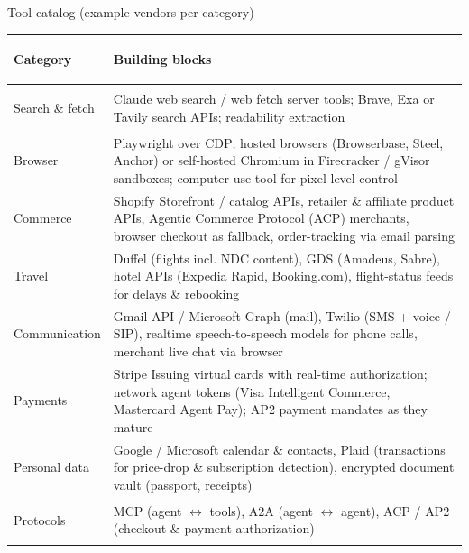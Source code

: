 \documentclass[aspectratio=169,10pt]{beamer}
\begin{document}
\begin{frame}{Tool catalog (example vendors per category)}
\scriptsize
\renewcommand{\arraystretch}{1.3}
\begin{tabularx}{\linewidth}{>{\bfseries\raggedright\arraybackslash}p{2.4cm} X}
\toprule
Category & Building blocks\\
\midrule
Search \& fetch & Claude web search / web fetch server tools; Brave, Exa or Tavily search APIs; readability extraction\\
Browser & Playwright over CDP; hosted browsers (Browserbase, Steel, Anchor) or self-hosted Chromium in Firecracker / gVisor sandboxes; computer-use tool for pixel-level control\\
Commerce & Shopify Storefront / catalog APIs, retailer \& affiliate product APIs, Agentic Commerce Protocol (ACP) merchants, browser checkout as fallback, order-tracking via email parsing\\
Travel & Duffel (flights incl. NDC content), GDS (Amadeus, Sabre), hotel APIs (Expedia Rapid, Booking.com), flight-status feeds for delays \& rebooking\\
Communication & Gmail API / Microsoft Graph (mail), Twilio (SMS + voice / SIP), realtime speech-to-speech models for phone calls, merchant live chat via browser\\
Payments & Stripe Issuing virtual cards with real-time authorization; network agent tokens (Visa Intelligent Commerce, Mastercard Agent Pay); AP2 payment mandates as they mature\\
Personal data & Google / Microsoft calendar \& contacts, Plaid (transactions for price-drop \& subscription detection), encrypted document vault (passport, receipts)\\
Protocols & MCP (agent $\leftrightarrow$ tools), A2A (agent $\leftrightarrow$ agent), ACP / AP2 (checkout \& payment authorization)\\
\bottomrule
\end{tabularx}
\end{frame}
\end{document}
